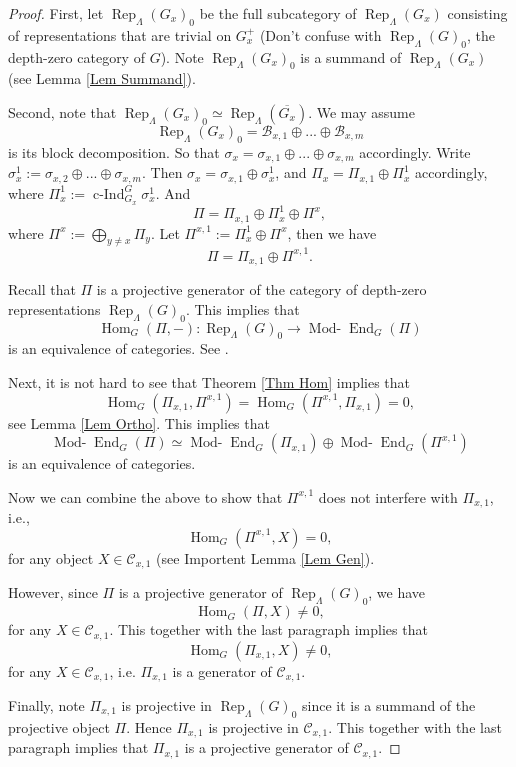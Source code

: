 \documentclass{article}
\DeclareMathOperator{\cInd}{\operatorname{c-Ind}}
\newcommand{\Hom}{\operatorname{Hom}}
\newcommand{\Rep}{\operatorname{Rep}}
\newcommand{\End}{\operatorname{End}}
\newcommand{\Modr}{\operatorname{Mod-}}
\begin{document}
	\begin{proof}
		First, let $\Rep_{\Lambda}(G_x)_0$ be the full subcategory of $\Rep_{\Lambda}(G_x)$ consisting of representations that are trivial on $G_x^+$ (Don't confuse with $\Rep_{\Lambda}(G)_0$, the depth-zero category of $G$). Note $\Rep_{\Lambda}(G_x)_0$ is a summand of $\Rep_{\Lambda}(G_x)$ (see Lemma \ref{Lem Summand}).
		
		Second, note that $\Rep_{\Lambda}(G_x)_0 \simeq \Rep_{\Lambda}(\overline{G_x})$. We may assume $$\Rep_{\Lambda}(G_x)_0=\mathcal{B}_{x,1} \oplus ... \oplus \mathcal{B}_{x,m}$$
		is its block decomposition. So that $\sigma_x=\sigma_{x,1}\oplus...\oplus\sigma_{x,m}$ accordingly. Write $\sigma_x^1:=\sigma_{x,2}\oplus...\oplus\sigma_{x,m}$. Then $\sigma_x=\sigma_{x,1} \oplus \sigma_x^1$, and $\Pi_x=\Pi_{x,1} \oplus \Pi_x^1$ accordingly, where $\Pi_x^1:=\cInd_{G_x}^G\sigma_x^1$. And
		$$\Pi=\Pi_{x,1}\oplus \Pi_x^1 \oplus \Pi^x,$$
		where $\Pi^x:=\bigoplus_{y \neq x}\Pi_y$. Let $\Pi^{x,1}:=\Pi_x^1 \oplus \Pi^x$, then we have
		$$\Pi=\Pi_{x,1} \oplus \Pi^{x,1}.$$
		
		Recall that $\Pi$ is a projective generator of the category of depth-zero representations $\Rep_{\Lambda}(G)_0$. This implies that 
		$$\Hom_G(\Pi, -): \Rep_{\Lambda}(G)_0 \to \Modr\End_G(\Pi)$$
		is an equivalence of categories. See \cite[Lemma 22]{bernsteindraft}.
		
		Next, it is not hard to see that Theorem \ref{Thm Hom} implies that 
		$$\Hom_G(\Pi_{x,1}, \Pi^{x,1})=\Hom_G(\Pi^{x,1}, \Pi_{x,1})=0,$$
		see Lemma \ref{Lem Ortho}. This implies that $$\Modr\End_G(\Pi) \simeq \Modr\End_G(\Pi_{x,1}) \oplus \Modr\End_G(\Pi^{x,1})$$ is an equivalence of categories.
		
		Now we can combine the above to show that $\Pi^{x,1}$ does not interfere with $\Pi_{x,1}$, i.e.,
		$$\Hom_G(\Pi^{x,1}, X)=0,$$
		for any object $X \in \mathcal{C}_{x,1}$ (see Importent Lemma \ref{Lem Gen}).
		
		However, since $\Pi$ is a projective generator of $\Rep_{\Lambda}(G)_0$, we have
		$$\Hom_G(\Pi, X) \neq 0,$$
		for any $X \in \mathcal{C}_{x,1}$. This together with the last paragraph implies that 
		$$\Hom_G(\Pi_{x,1}, X) \neq 0,$$
		for any $X \in \mathcal{C}_{x,1}$, i.e. $\Pi_{x,1}$ is a generator of $\mathcal{C}_{x,1}$.
		
		Finally, note $\Pi_{x,1}$ is projective in $\Rep_{\Lambda}(G)_0$ since it is a summand of the projective object $\Pi$. Hence $\Pi_{x,1}$ is projective in $\mathcal{C}_{x,1}$. This together with the last paragraph implies that $\Pi_{x,1}$ is a projective generator of $\mathcal{C}_{x,1}$.
	
		
	\end{proof}
	
\end{document}
